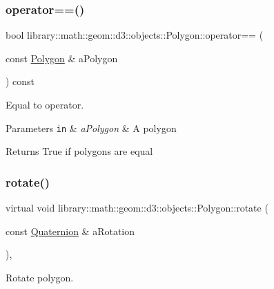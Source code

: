 \subsubsection{\texorpdfstring{operator==()}{operator==()}}
{\footnotesize\ttfamily bool library\+::math\+::geom\+::d3\+::objects\+::\+Polygon\+::operator== (\begin{DoxyParamCaption}\item[{const \hyperlink{classlibrary_1_1math_1_1geom_1_1d3_1_1objects_1_1_polygon}{Polygon} \&}]{a\+Polygon }\end{DoxyParamCaption}) const}



Equal to operator. 


\begin{DoxyCode}
\end{DoxyCode}



\begin{DoxyParams}[1]{Parameters}
\mbox{\tt in}  & {\em a\+Polygon} & A polygon \\
\hline
\end{DoxyParams}
\begin{DoxyReturn}{Returns}
True if polygons are equal 
\end{DoxyReturn}
\mbox{\label{classlibrary_1_1math_1_1geom_1_1d3_1_1objects_1_1_polygon_a9c0c40a85f57ad69a59adc354181eec0}} 
\subsubsection{\texorpdfstring{rotate()}{rotate()}}
{\footnotesize\ttfamily virtual void library\+::math\+::geom\+::d3\+::objects\+::\+Polygon\+::rotate (\begin{DoxyParamCaption}\item[{const \hyperlink{classlibrary_1_1math_1_1geom_1_1trf_1_1rot_1_1_quaternion}{Quaternion} \&}]{a\+Rotation }\end{DoxyParamCaption})\hspace{0.3cm}{\ttfamily [override]}, {\ttfamily [virtual]}}



Rotate polygon. 


